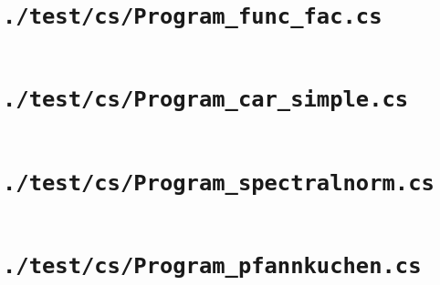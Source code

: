 \documentclass[a4paper, 11pt]{report}
\begin{document}
    \section{\lstinline{./test/cs/Program_func_fac.cs}}
    \inputminted{csharp}{./test/cs/Program_func_fac.cs}


    \section{\lstinline{./test/cs/Program_car_simple.cs}}
    \inputminted{csharp}{./test/cs/Program_car_simple.cs}


    \section{\lstinline{./test/cs/Program_spectralnorm.cs}}
    \inputminted{csharp}{./test/cs/Program_spectralnorm.cs}


    \section{\lstinline{./test/cs/Program_pfannkuchen.cs}}
    \inputminted{csharp}{./test/cs/Program_pfannkuchen.cs}
\end{document}
